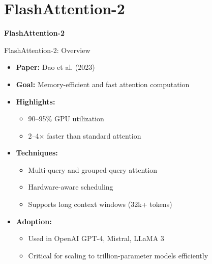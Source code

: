 \section{FlashAttention-2}
\begin{frame}{}
    \LARGE \textbf{FlashAttention-2}
\end{frame}


\begin{frame}{FlashAttention-2: Overview}
    \begin{itemize}
        \item \textbf{Paper:} Dao et al. (2023)
        \item \textbf{Goal:} Memory-efficient and fast attention computation
        \item \textbf{Highlights:}
        \begin{itemize}
            \item 90--95\% GPU utilization
            \item 2--4$\times$ faster than standard attention
        \end{itemize}
        \item \textbf{Techniques:}
        \begin{itemize}
            \item Multi-query and grouped-query attention
            \item Hardware-aware scheduling
            \item Supports long context windows (32k+ tokens)
        \end{itemize}
        \item \textbf{Adoption:}
        \begin{itemize}
            \item Used in OpenAI GPT-4, Mistral, LLaMA 3
            \item Critical for scaling to trillion-parameter models efficiently
        \end{itemize}
    \end{itemize}
\end{frame}


